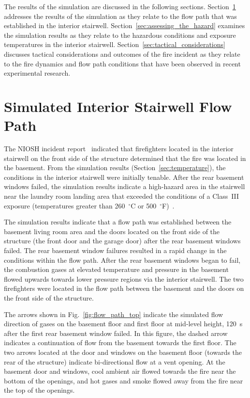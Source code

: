 \documentclass[12pt,oneside]{book}
\begin{document}
The results of the simulation are discussed in the following sections. Section~\ref{sec:simulated_flow_path} addresses the results of the simulation as they relate to the flow path that was established in the interior stairwell. Section~\ref{sec:assessing_the_hazard} examines the simulation results as they relate to the hazardous conditions and exposure temperatures in the interior stairwell. Section~\ref{sec:tactical_considerations} discusses tactical considerations and outcomes of the fire incident as they relate to the fire dynamics and flow path conditions that have been observed in recent experimental research.

\section{Simulated Interior Stairwell Flow Path}
\label{sec:simulated_flow_path}

The NIOSH incident report~\cite{NIOSH:Bowyer2} indicated that firefighters located in the interior stairwell on the front side of the structure determined that the fire was located in the basement. From the simulation results (Section~\ref{sec:temperature}), the conditions in the interior stairwell were initially tenable. After the rear basement windows failed, the simulation results indicate a high-hazard area in the stairwell near the laundry room landing area that exceeded the conditions of a Class~III exposure (temperatures greater than 260~$^{\circ}$C or 500~$^{\circ}$F)~\cite{Donnelly2006}.

The simulation results indicate that a flow path was established between the basement living room area and the doors located on the front side of the structure (the front door and the garage door) after the rear basement windows failed. The rear basement window failures resulted in a rapid change in the conditions within the flow path. After the rear basement windows began to fail, the combustion gases at elevated temperature and pressure in the basement flowed upwards towards lower pressure regions via the interior stairwell. The two firefighters were located in the flow path between the basement and the doors on the front side of the structure.

The arrows shown in Fig.~\ref{fig:flow_path_top} indicate the simulated flow direction of gases on the basement floor and first floor at mid-level height, 120~s after the first rear basement window failed. In this figure, the dashed arrow indicates a continuation of flow from the basement towards the first floor. The two arrows located at the door and windows on the basement floor (towards the rear of the structure) indicate bi-directional flow at a vent opening. At the basement door and windows, cool ambient air flowed towards the fire near the bottom of the openings, and hot gases and smoke flowed away from the fire near the top of the openings.
\end{document}
